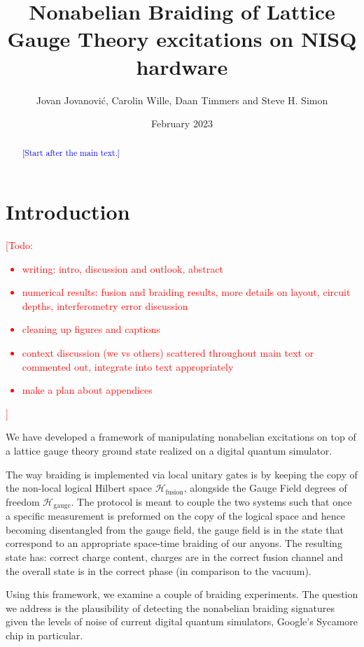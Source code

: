 \documentclass[two column]{article}
\title{Nonabelian Braiding of Lattice Gauge Theory excitations on NISQ hardware}
\author{Jovan Jovanovi\'c, Carolin Wille, Daan Timmers and Steve H. Simon}
\date{February 2023}
\newcommand{\caro}[1]{\textcolor{red}{[#1]}}
\newcommand{\jovan}[1]{\textcolor{blue}{[#1]}}
\begin{document}
\maketitle
\begin{abstract}
\jovan{Start after the main text.}
\end{abstract}
\tableofcontents



\section{Introduction}
\caro{Todo: \begin{itemize}
	\item writing: intro, discussion and outlook, abstract
	\item numerical results: fusion and braiding results, more details on layout, circuit depths, interferometry error discussion
	\item cleaning up figures and captions
	\item context discussion (we vs others) scattered throughout main text or commented out, integrate into text appropriately
	\item make a plan about appendices
\end{itemize}
}



We have developed a framework of manipulating nonabelian excitations on top of a lattice gauge theory ground state realized on a digital quantum simulator.

The way braiding is implemented via local unitary gates is by keeping the copy of the non-local logical Hilbert space $\mathcal{H}_{\text{fusion}}$, alongside the Gauge Field degrees of freedom $\mathcal{H}_{\text{gauge}}$. The protocol is meant to couple the two systems such that once a specific measurement is preformed on the copy of the logical space and hence becoming disentangled from the gauge field, the gauge field is in the state that correspond to an appropriate space-time braiding of our anyons. The resulting state has: correct charge content, charges are in the correct fusion channel and the overall state is in the correct phase (in comparison to the vacuum).

Using this framework, we examine a couple of braiding experiments. The question we address is the plausibility of detecting the nonabelian braiding signatures given the levels of noise of current digital quantum simulators, Google's Sycamore chip in particular.
\end{document}

